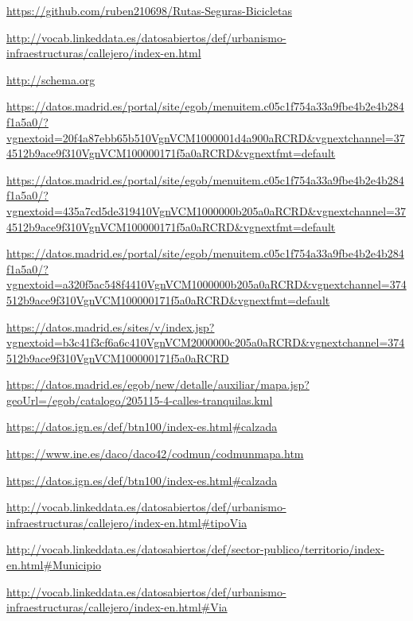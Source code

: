 \begin{thebibliography}{99}

\url{https://github.com/ruben210698/Rutas-Seguras-Bicicletas}

\url{http://vocab.linkeddata.es/datosabiertos/def/urbanismo-infraestructuras/callejero/index-en.html}

\url{http://schema.org}

\url{https://datos.madrid.es/portal/site/egob/menuitem.c05c1f754a33a9fbe4b2e4b284f1a5a0/?vgnextoid=20f4a87ebb65b510VgnVCM1000001d4a900aRCRD&vgnextchannel=374512b9ace9f310VgnVCM100000171f5a0aRCRD&vgnextfmt=default}

\url{https://datos.madrid.es/portal/site/egob/menuitem.c05c1f754a33a9fbe4b2e4b284f1a5a0/?vgnextoid=435a7cd5de319410VgnVCM1000000b205a0aRCRD&vgnextchannel=374512b9ace9f310VgnVCM100000171f5a0aRCRD&vgnextfmt=default}

\url{https://datos.madrid.es/portal/site/egob/menuitem.c05c1f754a33a9fbe4b2e4b284f1a5a0/?vgnextoid=a320f5ac548f4410VgnVCM1000000b205a0aRCRD&vgnextchannel=374512b9ace9f310VgnVCM100000171f5a0aRCRD&vgnextfmt=default}


\url{https://datos.madrid.es/sites/v/index.jsp?vgnextoid=b3c41f3cf6a6c410VgnVCM2000000c205a0aRCRD&vgnextchannel=374512b9ace9f310VgnVCM100000171f5a0aRCRD}


\url{https://datos.madrid.es/egob/new/detalle/auxiliar/mapa.jsp?geoUrl=/egob/catalogo/205115-4-calles-tranquilas.kml}


\url{https://datos.ign.es/def/btn100/index-es.html#calzada}

\url{https://www.ine.es/daco/daco42/codmun/codmunmapa.htm}

\url{https://datos.ign.es/def/btn100/index-es.html#calzada}

\url{http://vocab.linkeddata.es/datosabiertos/def/urbanismo-infraestructuras/callejero/index-en.html#tipoVia}

\url{http://vocab.linkeddata.es/datosabiertos/def/sector-publico/territorio/index-en.html#Municipio}

\url{http://vocab.linkeddata.es/datosabiertos/def/urbanismo-infraestructuras/callejero/index-en.html#Via}


\end{thebibliography}
